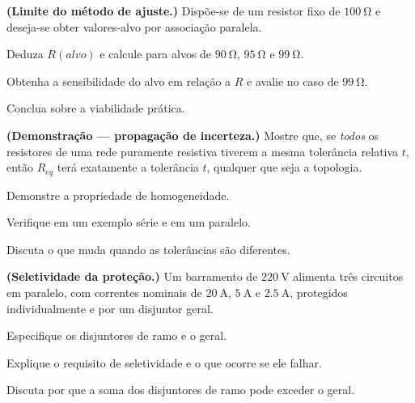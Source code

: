 \begin{questao}[4]{}

\textbf{(Limite do método de ajuste.)} Dispõe-se de um resistor fixo de
$\SI{100}{\ohm}$ e deseja-se obter valores-alvo por associação paralela.
\begin{itensq}
\item Deduza $R(alvo)$ e calcule para alvos de $\SI{90}{\ohm}$,
      $\SI{95}{\ohm}$ e $\SI{99}{\ohm}$.
\item Obtenha a sensibilidade do alvo em relação a $R$ e avalie no caso de
      $\SI{99}{\ohm}$.
\item Conclua sobre a viabilidade prática.
\end{itensq}


\end{questao}
\begin{questao}[4]{}

\textbf{(Demonstração --- propagação de incerteza.)} Mostre que, se
\emph{todos} os resistores de uma rede puramente resistiva tiverem a mesma
tolerância relativa $t$, então $R_{eq}$ terá exatamente a tolerância $t$,
qualquer que seja a topologia.
\begin{itensq}
\item Demonstre a propriedade de homogeneidade.
\item Verifique em um exemplo série e em um paralelo.
\item Discuta o que muda quando as tolerâncias são diferentes.
\end{itensq}


\end{questao}
\begin{questao}[4]{}

\textbf{(Seletividade da proteção.)} Um barramento de $\SI{220}{\volt}$
alimenta três circuitos em paralelo, com correntes nominais de
$\SI{20}{\ampere}$, $\SI{5}{\ampere}$ e $\SI{2.5}{\ampere}$, protegidos
individualmente e por um disjuntor geral.
\begin{itensq}
\item Especifique os disjuntores de ramo e o geral.
\item Explique o requisito de seletividade e o que ocorre se ele falhar.
\item Discuta por que a soma dos disjuntores de ramo pode exceder o geral.
\end{itensq}


\end{questao}

